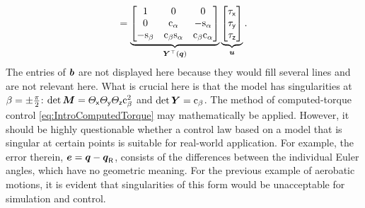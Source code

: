 \begin{multline}
 = \underbrace{\begin{bmatrix}
  1 & 0 & 0 \\
  0 & \mathrm{c}_{\alpha} & -\mathrm{s}_{\alpha} \\
  -\mathrm{s}_{\beta} & \mathrm{c}_{\beta} \mathrm{s}_{\alpha} & \mathrm{c}_{\beta} \mathrm{c}_{\alpha}
 \end{bmatrix}}_{\boldsymbol{Y}^\top(\boldsymbol{q})}
 \underbrace{\begin{bmatrix} \tau_{\mathsf{x}} \\ \tau_{\mathsf{y}} \\ \tau_{\mathsf{z}} \end{bmatrix}}_{\boldsymbol{u}}.
\end{multline}
The entries of $\boldsymbol{b}$ are not displayed here because they would fill several lines and are not relevant here.
What is crucial here is that the model has singularities at $\beta=\pm\tfrac{\pi}{2}$: $\det\boldsymbol{M} = \varTheta_{\mathsf{x}}\varTheta_{\mathsf{y}}\varTheta_{\mathsf{z}}\mathrm{c}_{\beta}^2$ and $\det\boldsymbol{Y} = \mathrm{c}_{\beta}$.
The method of computed-torque control \eqref{eq:IntroComputedTorque} may mathematically be applied.
However, it should be highly questionable whether a control law based on a model that is singular at certain points is suitable for real-world application.
For example, the error therein, $\boldsymbol{e} = \boldsymbol{q} - \boldsymbol{q}_{\mathsf{R}}$, consists of the differences between the individual Euler angles, which have no geometric meaning.
For the previous example of aerobatic motions, it is evident that singularities of this form would be unacceptable for simulation and control.


